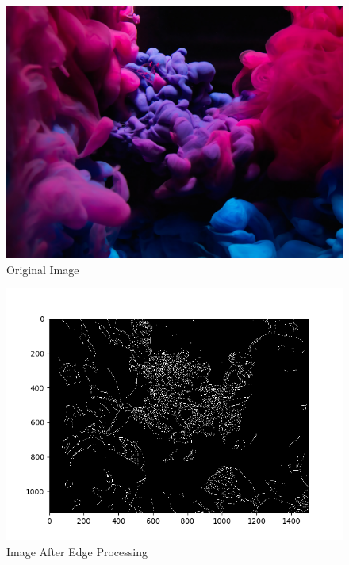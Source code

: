 \documentclass[11pt]{article}
\begin{document}
    \begin{figure}[h]
    \caption{Original Image}
    \centering
    \includegraphics[scale=0.22]{Exercise2_Image.jpg}
    \end{figure}

    \begin{figure}[h]
    \caption{Image After Edge Processing}
    \centering
    \includegraphics[scale=0.63]{myplot.png}
    \end{figure}
\end{document}
